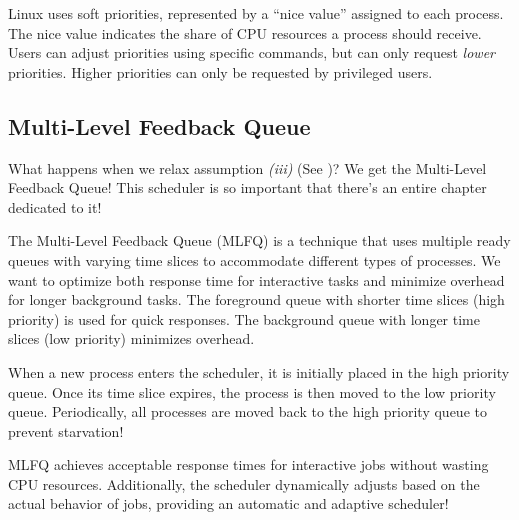 \documentclass{report}
\newcommand{\bookBegin}[1]{\begin{tcolorbox}[colback=black!5!white,colframe=black!75!black,title={\textit{Operating Systems, Three Easy Pieces: #1}}]}
\newcommand{\bookEnd}{\end{tcolorbox}}
\newcommand{\exampleBegin}[1]{\begin{tcolorbox}[colback=blue!5!white,colframe=black!75!blue,title={Example:
      #1}]}
\newcommand{\exampleEnd}{\end{tcolorbox}}
\begin{document}
\exampleBegin{Linux Priorities}
Linux uses soft priorities, represented by a ``nice value'' assigned to each process. The nice value
indicates the share of CPU resources a process should receive. Users can adjust priorities using
specific commands, but can only request \textit{lower} priorities. Higher priorities can only be
requested by privileged users.
\exampleEnd


\subsection{Multi-Level Feedback Queue}
\bookBegin{Multi-Level Feedback Queue}
What happens when we relax assumption \textit{(iii)} (See \textbf{})? We get
the Multi-Level Feedback Queue! This scheduler is so important that there's an entire chapter
dedicated to it!
\bookEnd

The Multi-Level Feedback Queue (MLFQ) is a technique that uses multiple ready queues with varying
time slices to accommodate different types of processes. We want to optimize both response time for
interactive tasks and minimize overhead for longer background tasks. The foreground queue with
shorter time slices (high priority) is used for quick responses. The background queue with longer
time slices (low priority) minimizes overhead.

When a new process enters the scheduler, it is initially placed in the high priority queue. Once its
time slice expires, the process is then moved to the low priority queue. Periodically, all processes
are moved back to the high priority queue to prevent starvation!

MLFQ achieves acceptable response times for interactive jobs without wasting CPU
resources. Additionally, the scheduler dynamically adjusts based on the actual behavior of jobs,
providing an automatic and adaptive scheduler!
\end{document}
